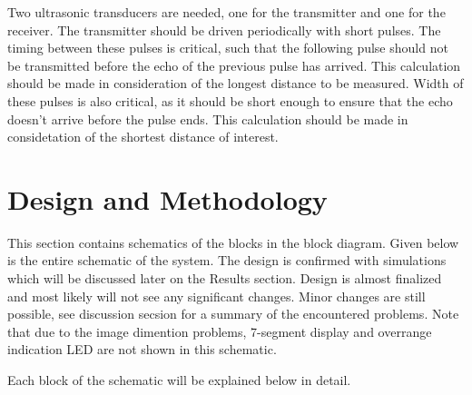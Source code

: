 \documentclass[12pt, a4paper]{article}
\begin{document}
        \bigskip 
        Two ultrasonic transducers are needed, one for the transmitter and one for the receiver. The transmitter should be driven periodically with short pulses. The timing between these pulses is critical, such that the following pulse should not be transmitted before the echo of the previous pulse has arrived. This calculation should be made in consideration of the longest distance to be measured. Width of these pulses is also critical, as it should be short enough to ensure that the echo doesn't arrive before the pulse ends. This calculation should be made in considetation of the shortest distance of interest. 
    

    \pagebreak    
    \section{Design and Methodology}
        
        This section contains schematics of the blocks in the block diagram. Given below is the entire schematic of the system. The design is confirmed with simulations which will be discussed later on the Results section. Design is almost finalized and most likely will not see any significant changes. Minor changes are still possible, see discussion secsion for a summary of the encountered problems. Note that due to the image dimention problems, 7-segment display and overrange indication LED are not shown in this schematic. 

        \noindent Each block of the schematic will be explained below in detail.

        \bigskip\bigskip

        \begin{figure}[H]\centering
                \caption[]{}
        \end{figure}
\end{document}
